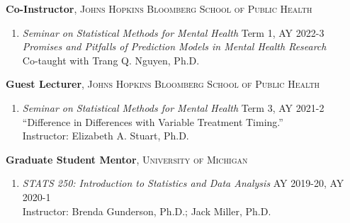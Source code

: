 \documentclass[letterpaper,11pt]{article} %
\begin{document}
		\noindent \textbf{Co-Instructor}, \textsc{Johns Hopkins Bloomberg School of Public Health}
		\begin{enumerate}
			\item \textit{Seminar on Statistical Methods for Mental Health} \hfill Term 1, AY 2022-3 \\
			\textit{Promises and Pitfalls of Prediction Models in Mental Health Research} \\
			Co-taught with Trang Q. Nguyen, Ph.D.
		\end{enumerate}
		
		\noindent \textbf{Guest Lecturer}, \textsc{Johns Hopkins Bloomberg School of Public Health}
		\begin{enumerate}
			\item \textit{Seminar on Statistical Methods for Mental Health} \hfill Term 3, AY 2021-2 \\
			``Difference in Differences with Variable Treatment Timing.'' \\
			Instructor: Elizabeth A. Stuart, Ph.D.
		\end{enumerate}
		
 		\noindent \textbf{Graduate Student Mentor}, \textsc{University of Michigan} 
 		\begin{enumerate}
 			\item \textit{STATS 250: Introduction to Statistics and Data Analysis} \hfill AY 2019-20, AY 2020-1 \\
 			Instructor: Brenda Gunderson, Ph.D.; Jack Miller, Ph.D.
 		\end{enumerate}
	
\end{document}
